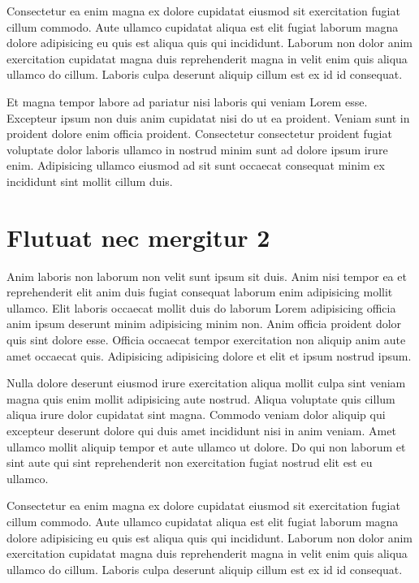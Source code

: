 \documentclass[a4paper,10pt,french]{sphinxmanual}
\begin{document}
Consectetur ea enim magna ex dolore cupidatat eiusmod sit exercitation fugiat cillum commodo. Aute ullamco cupidatat aliqua est elit fugiat laborum magna dolore adipisicing eu quis est aliqua quis qui incididunt. Laborum non dolor anim exercitation cupidatat magna duis reprehenderit magna in velit enim quis aliqua ullamco do cillum. Laboris culpa deserunt aliquip cillum est ex id id consequat.

Et magna tempor labore ad pariatur nisi laboris qui veniam Lorem esse. Excepteur ipsum non duis anim cupidatat nisi do ut ea proident. Veniam sunt in proident dolore enim officia proident. Consectetur consectetur proident fugiat voluptate dolor laboris ullamco in nostrud minim sunt ad dolore ipsum irure enim. Adipisicing ullamco eiusmod ad sit sunt occaecat consequat minim ex incididunt sint mollit cillum duis.


\section{Flutuat nec mergitur 2}
\label{\detokenize{docs/guides/autocad-guide02:flutuat-nec-mergitur-2}}
Anim laboris non laborum non velit sunt ipsum sit duis. Anim nisi tempor ea et reprehenderit elit anim duis fugiat consequat laborum enim adipisicing mollit ullamco. Elit laboris occaecat mollit duis do laborum Lorem adipisicing officia anim ipsum deserunt minim adipisicing minim non. Anim officia proident dolor quis sint dolore esse. Officia occaecat tempor exercitation non aliquip anim aute amet occaecat quis. Adipisicing adipisicing dolore et elit et ipsum nostrud ipsum.

Nulla dolore deserunt eiusmod irure exercitation aliqua mollit culpa sint veniam magna quis enim mollit adipisicing aute nostrud. Aliqua voluptate quis cillum aliqua irure dolor cupidatat sint magna. Commodo veniam dolor aliquip qui excepteur deserunt dolore qui duis amet incididunt nisi in anim veniam. Amet ullamco mollit aliquip tempor et aute ullamco ut dolore. Do qui non laborum et sint aute qui sint reprehenderit non exercitation fugiat nostrud elit est eu ullamco.

Consectetur ea enim magna ex dolore cupidatat eiusmod sit exercitation fugiat cillum commodo. Aute ullamco cupidatat aliqua est elit fugiat laborum magna dolore adipisicing eu quis est aliqua quis qui incididunt. Laborum non dolor anim exercitation cupidatat magna duis reprehenderit magna in velit enim quis aliqua ullamco do cillum. Laboris culpa deserunt aliquip cillum est ex id id consequat.
\end{document}
